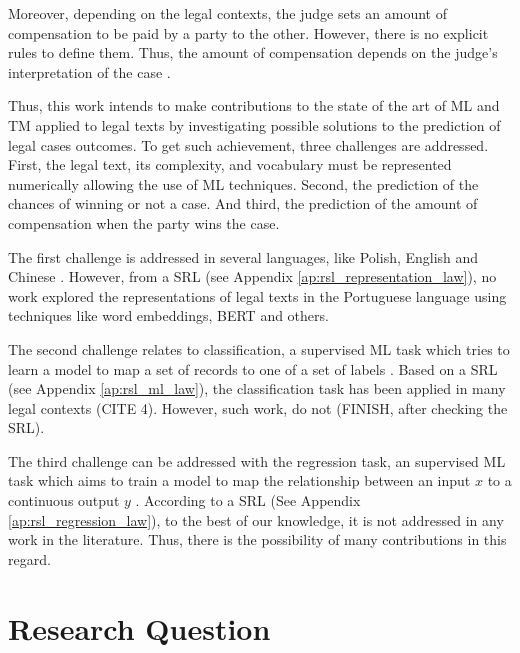 Moreover, depending on the legal contexts,  the judge sets an amount of compensation to be paid by a party to the other. However, there is no explicit rules to define them.  Thus, the amount of compensation depends on the judge's interpretation of the case \cite{Sadiku2020}. 


Thus, this work intends to make contributions to the state of the art of ML and TM applied to legal texts by investigating possible solutions to the prediction of legal cases outcomes.
To get such achievement, three challenges are addressed. First, the legal text, its  complexity, and vocabulary must be represented numerically allowing the use of ML techniques. Second, the prediction of the chances of winning or not a case. And third, the prediction of the amount of compensation when the party wins the case. 



The first challenge is addressed in several languages, like Polish, English and Chinese \cite{Chalkidis2019, SmywiskiPohl2019}. However, from a SRL (see Appendix \ref{ap:rsl_representation_law}), no work explored the representations of legal texts in the Portuguese language using techniques like word embeddings, BERT and others.

The second challenge relates to classification, a supervised ML task which tries to learn a model to map a set of records to one of a set of labels \cite{Aggarwal2013}. Based on a SRL (see Appendix \ref{ap:rsl_ml_law}), the classification task has been applied in many legal contexts (CITE 4). However, such work, do not (FINISH, after checking the SRL).

The third challenge can be addressed with the regression task, an supervised ML task which aims to train a model to map the relationship between an input $x$ to a continuous output $y$ \cite{Draper1998}. According to a SRL (See Appendix \ref{ap:rsl_regression_law}), to the best of our knowledge, it is not addressed in any work in the literature. Thus, there is the possibility of many contributions in this regard.



% 



\section{Research Question}

